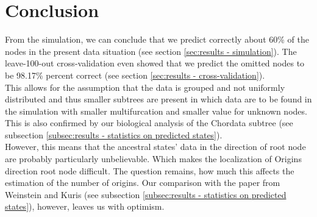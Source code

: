 
  \section{Conclusion}

    From the simulation, we can conclude that we predict correctly about 60\% of the nodes in the 
      present data situation (see section \ref{sec:results - simulation}).
    The leave-100-out cross-validation even showed that we predict the omitted nodes to be 98.17\%  
      percent correct (see section \ref{sec:results - cross-validation}). \\
    This allows for the assumption that the data is grouped and not uniformly distributed and thus 
      smaller subtrees are present in which data are to be found in the simulation with smaller 
      multifurcation and smaller value for unknown nodes. This is also confirmed by our biological 
      analysis of the Chordata subtree (see subsection \ref{subsec:results - statistics on predicted states}). \\
    However, this means that the ancestral states' data in the direction of root node are probably 
      particularly unbelievable. Which makes the localization of Origins direction root node 
      difficult. The question remains, how much this affects the estimation of the number of origins. 
      Our comparison with the paper from Weinstein and Kuris \cite{Weinstein2016} (see subsection 
      \ref{subsec:results - statistics on predicted states}), however, leaves us with optimism.



